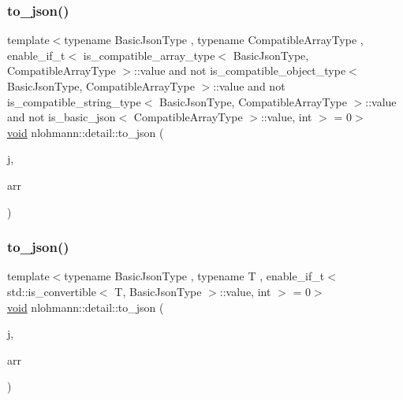 \subsubsection{\texorpdfstring{to\_json()}{to\_json()}\hspace{0.1cm}{\footnotesize\ttfamily [9/17]}}
{\footnotesize\ttfamily template$<$typename Basic\+Json\+Type , typename Compatible\+Array\+Type , enable\+\_\+if\+\_\+t$<$ is\+\_\+compatible\+\_\+array\+\_\+type$<$ Basic\+Json\+Type, Compatible\+Array\+Type $>$\+::value and not is\+\_\+compatible\+\_\+object\+\_\+type$<$ Basic\+Json\+Type, Compatible\+Array\+Type $>$\+::value and not is\+\_\+compatible\+\_\+string\+\_\+type$<$ Basic\+Json\+Type, Compatible\+Array\+Type $>$\+::value and not is\+\_\+basic\+\_\+json$<$ Compatible\+Array\+Type $>$\+::value, int $>$  = 0$>$ \\
\mbox{\hyperlink{namespacenlohmann_1_1detail_a59fca69799f6b9e366710cb9043aa77d}{void}} nlohmann\+::detail\+::to\+\_\+json (\begin{DoxyParamCaption}\item[{Basic\+Json\+Type \&}]{j,  }\item[{const Compatible\+Array\+Type \&}]{arr }\end{DoxyParamCaption})}

\mbox{\label{namespacenlohmann_1_1detail_a7f7c7b9760161b774cdc0b4b838fae64}} 
\subsubsection{\texorpdfstring{to\_json()}{to\_json()}\hspace{0.1cm}{\footnotesize\ttfamily [10/17]}}
{\footnotesize\ttfamily template$<$typename Basic\+Json\+Type , typename T , enable\+\_\+if\+\_\+t$<$ std\+::is\+\_\+convertible$<$ T, Basic\+Json\+Type $>$\+::value, int $>$  = 0$>$ \\
\mbox{\hyperlink{namespacenlohmann_1_1detail_a59fca69799f6b9e366710cb9043aa77d}{void}} nlohmann\+::detail\+::to\+\_\+json (\begin{DoxyParamCaption}\item[{Basic\+Json\+Type \&}]{j,  }\item[{const std\+::valarray$<$ \mbox{\hyperlink{_keyboard_event_8h_adf1f3edb9115acb0a1e04209b7a9937b}{T}} $>$ \&}]{arr }\end{DoxyParamCaption})}

